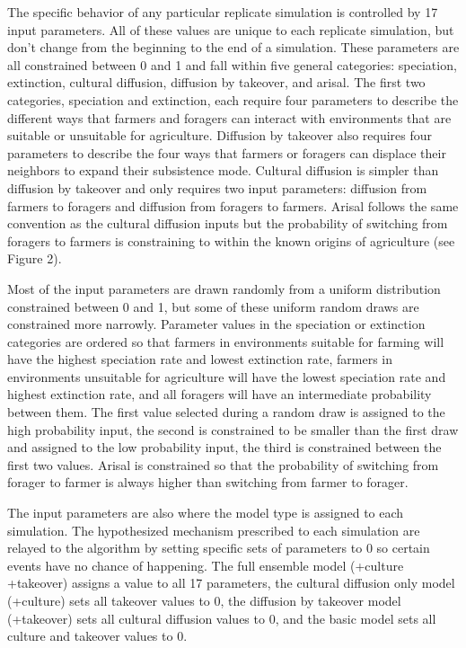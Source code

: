 \documentclass[]{book}
\theoremstyle{definition}
\theoremstyle{definition}
\theoremstyle{definition}
\theoremstyle{remark}
\begin{document}
The specific behavior of any particular replicate simulation is
controlled by 17 input parameters. All of these values are unique to
each replicate simulation, but don't change from the beginning to the
end of a simulation. These parameters are all constrained between 0 and
1 and fall within five general categories: speciation, extinction,
cultural diffusion, diffusion by takeover, and arisal. The first two
categories, speciation and extinction, each require four parameters to
describe the different ways that farmers and foragers can interact with
environments that are suitable or unsuitable for agriculture. Diffusion
by takeover also requires four parameters to describe the four ways that
farmers or foragers can displace their neighbors to expand their
subsistence mode. Cultural diffusion is simpler than diffusion by
takeover and only requires two input parameters: diffusion from farmers
to foragers and diffusion from foragers to farmers. Arisal follows the
same convention as the cultural diffusion inputs but the probability of
switching from foragers to farmers is constraining to within the known
origins of agriculture (see Figure 2).

Most of the input parameters are drawn randomly from a uniform
distribution constrained between 0 and 1, but some of these uniform
random draws are constrained more narrowly. Parameter values in the
speciation or extinction categories are ordered so that farmers in
environments suitable for farming will have the highest speciation rate
and lowest extinction rate, farmers in environments unsuitable for
agriculture will have the lowest speciation rate and highest extinction
rate, and all foragers will have an intermediate probability between
them. The first value selected during a random draw is assigned to the
high probability input, the second is constrained to be smaller than the
first draw and assigned to the low probability input, the third is
constrained between the first two values. Arisal is constrained so that
the probability of switching from forager to farmer is always higher
than switching from farmer to forager.

The input parameters are also where the model type is assigned to each
simulation. The hypothesized mechanism prescribed to each simulation are
relayed to the algorithm by setting specific sets of parameters to 0 so
certain events have no chance of happening. The full ensemble model
(+culture +takeover) assigns a value to all 17 parameters, the cultural
diffusion only model (+culture) sets all takeover values to 0, the
diffusion by takeover model (+takeover) sets all cultural diffusion
values to 0, and the basic model sets all culture and takeover values to
0.
\end{document}
